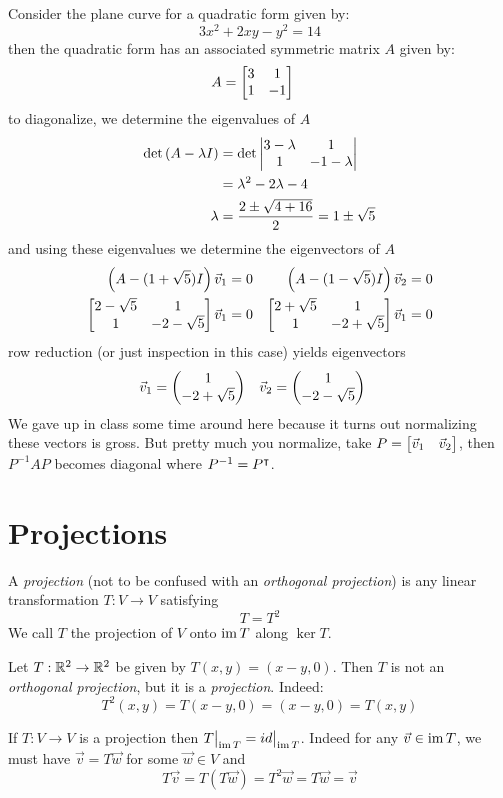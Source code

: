 \begin{defexample}
  Consider the plane curve for a quadratic form given by:
    $$3x^2 + 2xy - y^2 = 14$$
  then the quadratic form has an associated symmetric matrix $A$ given by:
    \begin{align}
      A &= \begin{bmatrix}3 & 1 \\ 1 & -1\end{bmatrix}
    \end{align}
  to diagonalize, we determine the eigenvalues of $A$
    \begin{align}
      \det\left(A - \lambda I\right)
        &= \det \begin{vmatrix}3-\lambda & 1 \\ 1 & -1-\lambda\end{vmatrix} \\
        &= \lambda^2 - 2\lambda - 4 \\
      \lambda &= \frac{2 \pm \sqrt{4+16}}{2} = 1 \pm \sqrt{5}
    \end{align}
  and using these eigenvalues we determine the eigenvectors of $A$
    \begin{align}
      \left(A-(1+\sqrt5)I\right)\vec v_1 &= 0 & \left(A-(1-\sqrt5)I\right)\vec v_2 &= 0 \\
      \begin{bmatrix}2 - \sqrt 5 & 1 \\ 1 & -2-\sqrt5\end{bmatrix}\vec v_1 &= 0 & \begin{bmatrix}2 + \sqrt 5 & 1 \\ 1 & -2+\sqrt5\end{bmatrix}\vec v_1 &= 0
    \end{align}
  row reduction (or just inspection in this case) yields eigenvectors
    \begin{align}
      \vec v_1 &= \begin{pmatrix}1 \\ -2 + \sqrt5\end{pmatrix} & \vec v_2 &= \begin{pmatrix}1 \\ -2-\sqrt5\end{pmatrix}
    \end{align}
  We gave up in class some time around here because it turns out normalizing these vectors is gross.
  But pretty much you normalize, take $P = \begin{bmatrix}\vec v_1 & \vec v_2\end{bmatrix}$, then $P^{-1} A P$ becomes diagonal where $P^{-1} = {P}^{\intercal}$.
\end{defexample}

\section{Projections}

\begin{definition}[Projection]
  A \emph{projection} (not to be confused with an \emph{orthogonal projection}) is any linear transformation
  $T : V \to V$ satisfying
    $$T = T^2$$
  We call $T$ the projection of $V$ onto $\operatorname{im} T$ along $\ker T$.
\end{definition}
\begin{defexample}
  Let $T : \mathbb{R}^2 \to \mathbb{R}^2$ be given by $T(x,y) = (x-y,0)$. Then $T$ is not an \emph{orthogonal projection}, but it is a \emph{projection}. Indeed:
    $$T^2(x,y) = T(x-y,0) = (x-y,0) = T(x,y)$$
\end{defexample}
\begin{remark}
  If $T : V \to V$ is a projection then $T\big\rvert_{\operatorname{im} T} = id\big\rvert_{\operatorname{im} T}$.
  Indeed for any $\vec v \in \operatorname{im} T$, we must have $\vec v = T\vec w$ for some $\vec w \in V$ and
    $$T\vec v = T(T\vec w) = T^2\vec w = T\vec w = \vec v$$
\end{remark}

